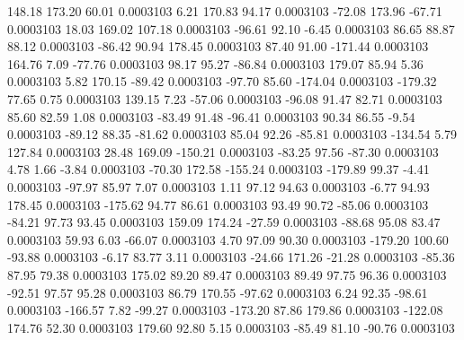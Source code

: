       148.18      173.20       60.01     0.0003103
        6.21      170.83       94.17     0.0003103
      -72.08      173.96      -67.71     0.0003103
       18.03      169.02      107.18     0.0003103
      -96.61       92.10       -6.45     0.0003103
       86.65       88.87       88.12     0.0003103
      -86.42       90.94      178.45     0.0003103
       87.40       91.00     -171.44     0.0003103
      164.76        7.09      -77.76     0.0003103
       98.17       95.27      -86.84     0.0003103
      179.07       85.94        5.36     0.0003103
        5.82      170.15      -89.42     0.0003103
      -97.70       85.60     -174.04     0.0003103
     -179.32       77.65        0.75     0.0003103
      139.15        7.23      -57.06     0.0003103
      -96.08       91.47       82.71     0.0003103
       85.60       82.59        1.08     0.0003103
      -83.49       91.48      -96.41     0.0003103
       90.34       86.55       -9.54     0.0003103
      -89.12       88.35      -81.62     0.0003103
       85.04       92.26      -85.81     0.0003103
     -134.54        5.79      127.84     0.0003103
       28.48      169.09     -150.21     0.0003103
      -83.25       97.56      -87.30     0.0003103
        4.78        1.66       -3.84     0.0003103
      -70.30      172.58     -155.24     0.0003103
     -179.89       99.37       -4.41     0.0003103
      -97.97       85.97        7.07     0.0003103
        1.11       97.12       94.63     0.0003103
       -6.77       94.93      178.45     0.0003103
     -175.62       94.77       86.61     0.0003103
       93.49       90.72      -85.06     0.0003103
      -84.21       97.73       93.45     0.0003103
      159.09      174.24      -27.59     0.0003103
      -88.68       95.08       83.47     0.0003103
       59.93        6.03      -66.07     0.0003103
        4.70       97.09       90.30     0.0003103
     -179.20      100.60      -93.88     0.0003103
       -6.17       83.77        3.11     0.0003103
      -24.66      171.26      -21.28     0.0003103
      -85.36       87.95       79.38     0.0003103
      175.02       89.20       89.47     0.0003103
       89.49       97.75       96.36     0.0003103
      -92.51       97.57       95.28     0.0003103
       86.79      170.55      -97.62     0.0003103
        6.24       92.35      -98.61     0.0003103
     -166.57        7.82      -99.27     0.0003103
     -173.20       87.86      179.86     0.0003103
     -122.08      174.76       52.30     0.0003103
      179.60       92.80        5.15     0.0003103
      -85.49       81.10      -90.76     0.0003103
